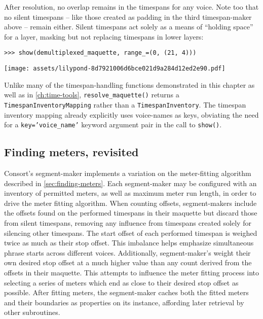 \noindent After resolution, no overlap remains in the timespans for any voice.
Note too that no silent timespans -- like those created as padding in the third
timespan-maker above -- remain either. Silent timespans act solely as a means
of \enquote{holding space} for a layer, masking but not replacing timespans in
lower layers:

\begin{comment}
<abjad>
show(demultiplexed_maquette, range_=(0, (21, 4)))
</abjad>
\end{comment}

\begin{abjadbookoutput}
\begin{singlespacing}
\vspace{-0.5\baselineskip}
\begin{lstlisting}
>>> show(demultiplexed_maquette, range_=(0, (21, 4)))
\end{lstlisting}
\noindent\texttt{[image: assets/lilypond-8d7921006d6bce021d9a284d12ed2e90.pdf]}
\end{singlespacing}
\end{abjadbookoutput}

\noindent Unlike many of the timespan-handling functions demonstrated in this
chapter as well as in \autoref{ch:time-tools}, \texttt{resolve\_maquette()}
returns a \texttt{TimespanInventoryMapping} rather than a
\texttt{TimespanInventory}. The timespan inventory mapping already
explicitly uses voice-names as keys, obviating the need for a
\texttt{key='voice\_name'} keyword argument pair in the call to
\texttt{show()}.

\subsection{Finding meters, revisited}
\label{ssec:finding-meters-revisited}

Consort's segment-maker implements a variation on the meter-fitting algorithm
described in \autoref{sec:finding-meters}. Each segment-maker may be configured
with an inventory of permitted meters, as well as maximum meter run length, in
order to drive the meter fitting algorithm. When counting offsets,
segment-makers include the offsets found on the performed timespans in their
maquette but discard those from silent timespans, removing any influence from
timespans created solely for silencing other timespans. The start offset of
each performed timespan is weighed twice as much as their stop offset. This
imbalance helps emphasize simultaneous phrase starts across different voices.
Additionally, segment-maker's weight their own desired stop offset at a much
higher value than any count derived from the offsets in their maquette. This
attempts to influence the meter fitting process into selecting a series of
meters which end as close to their desired stop offset as possible. After
fitting meters, the segment-maker caches both the fitted meters and their
boundaries as properties on its instance, affording later retrieval by other
subroutines.

